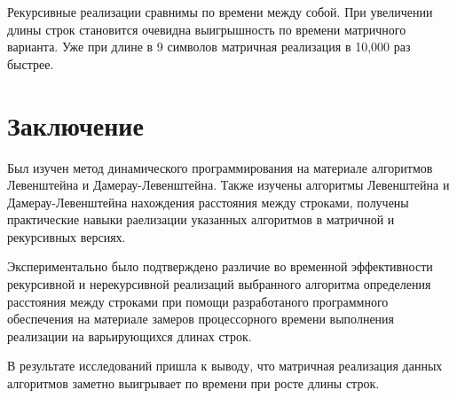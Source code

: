 \documentclass[12pt]{report}
\begin{document}


\par
Рекурсивные реализации сравнимы по времени между собой. При увеличении длины строк становится очевидна выигрышность по времени матричного варианта. Уже при длине в 9 символов матричная реализация в 10,000 раз быстрее.

\chapter*{Заключение}
Был изучен метод динамического программирования на материале алгоритмов Левенштейна и Дамерау-Левенштейна.
Также изучены алгоритмы Левенштейна и Дамерау-Левенштейна нахождения расстояния между строками, получены практические навыки раелизации указанных алгоритмов
в матричной  и рекурсивных версиях. 

Экспериментально было подтверждено различие во временной эффективности рекурсивной и нерекурсивной реализаций выбранного алгоритма определения расстояния между строками при помощи разработаного программного обеспечения на материале замеров процессорного времени выполнения реализации на варьирующихся длинах строк. 

В результате исследований пришла к выводу, что матричная реализация данных алгоритмов заметно выигрывает по времени при росте длины строк.
\end{document}
